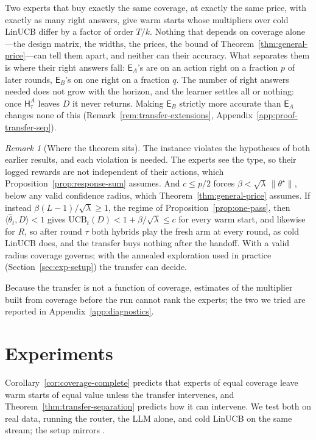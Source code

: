 \documentclass{article}
\theoremstyle{definition}
\theoremstyle{remark}
\newtheorem{remark}{Remark}
\theoremstyle{remark}
\newcommand{\Exp}{\mathsf{E}}
\newcommand{\Hyb}{\mathsf{H}}
\begin{document}
Two experts that buy exactly the same coverage, at exactly the same price,
with exactly as many right answers, give warm starts whose multipliers over
cold LinUCB differ by a factor of order $T/k$. Nothing that depends on
coverage alone---the design matrix, the widths, the prices, the bound of
Theorem~\ref{thm:general-price}---can tell them apart, and neither can their
accuracy. What separates them is where their right answers fall:
$\Exp_A$'s are on an action right on a fraction $p$ of later rounds,
$\Exp_B$'s on one right on a fraction $q$. The number of right answers needed
does not grow with the horizon, and the learner settles all or nothing: once
$\Hyb^A_\tau$ leaves $D$ it never returns. Making $\Exp_B$ strictly more
accurate than $\Exp_A$ changes none of this
(Remark~\ref{rem:transfer-extensions}, Appendix~\ref{app:proof-transfer-sep}).

\begin{remark}[Where the theorem sits]
\label{rem:transfer-regime}
The instance violates the hypotheses of both earlier results, and each
violation is needed. The experts see the type, so their logged rewards are not
independent of their actions, which Proposition~\ref{prop:response-sum}
assumes. And $c\le p/2$ forces $\beta<\sqrt\lambda\,\|\theta^\star\|$, below
any valid confidence radius, which Theorem~\ref{thm:general-price} assumes.
If instead $\beta(L-1)/\sqrt\lambda\ge1$, the regime of
Proposition~\ref{prop:one-pass}, then $\langle\widehat\theta_t,D\rangle<1$
gives $\mathrm{UCB}_t(D)<1+\beta/\sqrt\lambda\le c$ for every warm start,
and likewise for $R$, so after round $\tau$ both hybrids play the fresh arm
at every round, as cold LinUCB does, and the transfer buys nothing after the
handoff. With a valid radius coverage governs; with the annealed exploration
used in practice (Section~\ref{sec:exp-setup}) the transfer can decide.
\end{remark}

Because the transfer is not a function of coverage, estimates of the
multiplier built from coverage before the run cannot rank the experts; the
two we tried are reported in Appendix~\ref{app:diagnostics}.

\section{Experiments}
\label{sec:experiments}

Corollary~\ref{cor:coverage-complete} predicts that experts of equal coverage
leave warm starts of equal value unless the transfer intervenes, and
Theorem~\ref{thm:transfer-separation} predicts how it can intervene. We test
both on real data, running the router, the LLM alone, and cold LinUCB on the
same stream; the setup mirrors \cite{chen2024llmdecision}.
\end{document}
